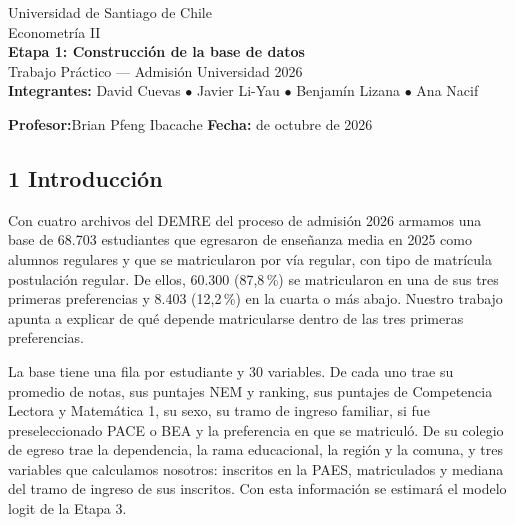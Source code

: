 \documentclass[11pt]{article}
\begin{document}
\sloppy

\begin{titlepage}
\centering
\vspace*{3cm}
{\large Universidad de Santiago de Chile}\\[6pt]
{\large Econometría II}\\[2cm]
{\LARGE \textbf{Etapa 1: Construcción de la base de datos}}\\[10pt]
{\large Trabajo Práctico --- Admisión Universidad 2026}\\[3cm]

\textbf{Integrantes:}\quad
David Cuevas $\bullet$ Javier Li-Yau $\bullet$ Benjamín Lizana $\bullet$ Ana Nacif

\vspace{0.6cm}

\textbf{Profesor:}\quad Brian Pfeng Ibacache
\qquad
\textbf{Fecha:} de octubre de 2026
\end{titlepage}

\subsection*{1 \; Introducción}

Con cuatro archivos del DEMRE del proceso de admisión 2026 armamos una
base de 68.703 estudiantes que egresaron de enseñanza media en 2025 como
alumnos regulares y que se matricularon por vía regular, con tipo de
matrícula postulación regular. De ellos, 60.300 (87,8\,\%) se
matricularon en una de sus tres primeras preferencias y 8.403
(12,2\,\%) en la cuarta o más abajo. Nuestro trabajo apunta a explicar
de qué depende matricularse dentro de las tres primeras preferencias.

La base tiene una fila por estudiante y 30 variables. De cada uno trae
su promedio de notas, sus puntajes NEM y ranking, sus puntajes de
Competencia Lectora y Matemática 1, su sexo, su tramo de ingreso
familiar, si fue preseleccionado PACE o BEA y la preferencia en que se
matriculó. De su colegio de egreso trae la dependencia, la rama
educacional, la región y la comuna, y tres variables que calculamos
nosotros: inscritos en la PAES, matriculados y mediana del tramo de
ingreso de sus inscritos. Con esta información se estimará el modelo
logit de la Etapa 3.
\end{document}
